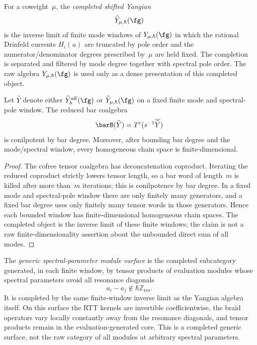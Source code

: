 \begin{definition}
\label{def:shifted-yangian-completion}
For a coweight~$\mu$, the \emph{completed shifted Yangian}
\[
\widehat Y_{\mu,\hbar}(\fg)
\]
is the inverse limit of finite mode windows of
$Y_{\mu,\hbar}(\fg)$ in which the rational Drinfeld currents
$H_i(u)$ are truncated by pole order and the numerator/denominator
degrees prescribed by~$\mu$ are held fixed.  The completion is
separated and filtered by mode degree together with spectral pole
order.  The raw algebra $Y_{\mu,\hbar}(\fg)$ is used only as a dense
presentation of this completed object.
\end{definition}

\begin{proposition}
\label{prop:yangian-completed-bar-finite-pieces}
Let $\widehat Y$ denote either
$\widehat Y^{\mathrm{aff}}_\hbar(\fg)$ or
$\widehat Y_{\mu,\hbar}(\fg)$ on a fixed finite mode and spectral-pole
window.  The reduced bar coalgebra
\[
\barB(\widehat Y)=T^c(s^{-1}\overline{\widehat Y})
\]
is conilpotent by bar degree.  Moreover, after bounding bar degree and
the mode/spectral window, every homogeneous chain space is
finite-dimensional.
\end{proposition}

\begin{proof}
The cofree tensor coalgebra has deconcatenation coproduct.  Iterating
the reduced coproduct strictly lowers tensor length, so a bar word of
length~$m$ is killed after more than~$m$ iterations; this is
conilpotence by bar degree.  In a fixed mode and spectral-pole window
there are only finitely many generators, and a fixed bar degree uses
only finitely many tensor words in those generators.  Hence each
bounded window has finite-dimensional homogeneous chain spaces.  The
completed object is the inverse limit of these finite windows; the
claim is not a raw finite-dimensionality assertion about the unbounded
direct sum of all modes.
\end{proof}

\begin{definition}
\label{def:generic-spectral-parameter-surface}
The \emph{generic spectral-parameter module surface} is the completed
subcategory generated, in each finite window, by tensor products of
evaluation modules whose spectral parameters avoid all resonance
diagonals
\[
a_i-a_j\notin \hbar\mathbb Z_{\mathrm{res}}.
\]
It is completed by the same finite-window inverse limit as the
Yangian algebra itself.  On this surface the RTT kernels are invertible
coefficientwise, the braid operators vary locally constantly away from
the resonance diagonals, and tensor products remain in the
evaluation-generated core.  This is a completed generic surface, not
the raw category of all modules at arbitrary spectral parameters.
\end{definition}

